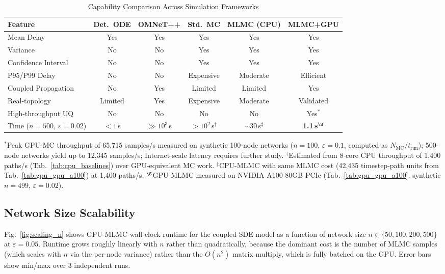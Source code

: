 \documentclass[pdflatex,sn-mathphys-num]{sn-jnl}
\theoremstyle{thmstyleone}%
\theoremstyle{thmstyletwo}%
\theoremstyle{thmstylethree}%
\begin{document}
\begin{table}[!t]
\caption{Capability Comparison Across Simulation Frameworks}
\label{tab:capability}
\centering\small
\setlength{\tabcolsep}{4pt}%
\begin{tabular*}{\linewidth}{@{\extracolsep\fill}p{2.2cm} c c c c c@{}}
\toprule
Feature & Det.\ ODE & OMNeT++ & Std.\ MC & MLMC (CPU) & MLMC+GPU \\
\midrule
Mean Delay & Yes & Yes & Yes & Yes & Yes \\
Variance & No & No & Yes & Yes & Yes \\
Confidence Interval & No & No & Yes & Yes & Yes \\
P95/P99 Delay & No & No & Expensive & Moderate & Efficient \\
Coupled Propagation & No & Yes & Limited & Limited & Yes \\
Real-topology & Limited & Yes & Expensive & Moderate & Validated \\
High-throughput UQ & No & No & No & No & Yes$^*$ \\
\midrule
Time ($n{=}500$, $\varepsilon{=}0.02$) & $<1$\,s & $\gg\!10^3$\,s & $>10^2$\,s$^\dagger$ &
$\sim\!30$\,s$^\ddagger$ & \textbf{1.1\,s}$^\S$ \\
\bottomrule
\end{tabular*}
\end{table}

\par\noindent\footnotesize $^*$Peak GPU-MC throughput of 65,715 samples/s measured on synthetic
100-node networks ($n\!=\!100$, $\varepsilon=0.1$, computed as $N_{\text{MC}}/t_{\text{run}}$);
500-node networks yield up to 12,345 samples/s; Internet-scale latency requires further study.
$^\dagger$Estimated from 8-core CPU throughput of 1,400 paths/s (Tab.~\ref{tab:cpu_baselines})
over GPU-equivalent MC work. $^\ddagger$CPU-MLMC with same MLMC cost (42,435 timestep-path units
from Tab.~\ref{tab:gpu_gpu_a100}) at 1,400 paths/s. $^\S$GPU-MLMC measured on NVIDIA A100 80GB
PCIe (Tab.~\ref{tab:gpu_gpu_a100}, synthetic $n{=}499$, $\varepsilon{=}0.02$).\normalsize

\subsection{Network Size Scalability}
\label{subsec:scaling}

Fig.~\ref{fig:scaling_n} shows GPU-MLMC wall-clock runtime for the coupled-SDE model as a
function of network size $n \in \{50, 100, 200, 500\}$ at $\varepsilon=0.05$. Runtime grows
roughly linearly with $n$ rather than quadratically, because the dominant cost is the number of
MLMC samples (which scales with $n$ via the per-node variance) rather than the $O(n^2)$ matrix
multiply, which is fully batched on the GPU. Error bars show min/max over 3 independent runs.
\end{document}
